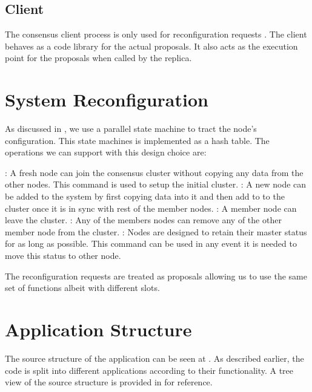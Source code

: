 \subsection{Client}

The consensus client process is only used for reconfiguration requests
. The client behaves as a code library for the actual
proposals. It also acts as the execution point for the proposals when called
by the replica.

\section{System Reconfiguration}
\label{section:impl.rcfg}

As discussed in , we use a parallel state machine
to tract the node's configuration. This state machines is implemented as a
hash table. The operations we can support with this design choice are:

\begin{itemize}
    : A fresh node can join the consensus cluster without copying
    any data from the other nodes. This command is used to setup the initial
    cluster.
    : A new node can be added to the system by first
    copying data into it and then add to to the cluster once it is in sync with
    rest of the member nodes.
    : A member node can leave the cluster.
    : Any of the members nodes can remove any of the other member
    node from the cluster.
    : Nodes are designed to retain their master status
    for as long as possible. This command can be used in any event it is needed
    to move this status to other node.
\end{itemize}

The reconfiguration requests are treated as proposals allowing us to use the
same set of functions albeit with different slots.

\section{Application Structure}

The source structure of the application can be seen at .
As described earlier, the code is split into different applications according
to their functionality. A tree view of the source structure is provided in
 for reference.

